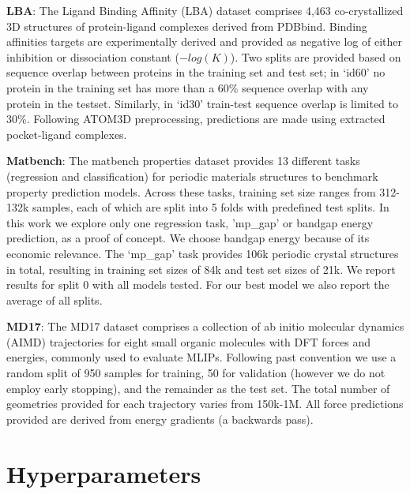 \textbf{LBA}: The Ligand Binding Affinity (LBA) dataset comprises 4,463  co-crystallized 3D structures of  protein-ligand complexes derived from PDBbind. Binding affinities targets are experimentally derived and provided as negative log of either inhibition or dissociation constant ($-log(K)$). Two splits are provided based on sequence overlap between proteins in the training set and test set; in ‘id60’ no protein in the training set has more than a 60\% sequence overlap with any protein in the testset. Similarly, in ‘id30’ train-test sequence overlap is limited to 30\%. Following ATOM3D preprocessing\cite{LBA_dataset}, predictions are made using extracted pocket-ligand complexes.


\textbf{Matbench}: The matbench properties dataset \cite{matbench_2020} provides 13 different tasks (regression and classification) for periodic materials structures to benchmark property prediction models. Across these tasks, training set size ranges from 312-132k samples, each of which are split into 5 folds with predefined test splits. In this work we explore only one regression task, 'mp\_gap' or bandgap energy prediction, as a proof of concept. We choose bandgap energy because of its economic relevance. The ‘mp\_gap’ task provides 106k periodic crystal structures in total, resulting in training set sizes of 84k and test set sizes of 21k. We report results for split 0 with all models tested. For our best model we also report the average of all splits.

\textbf{MD17}: The MD17 \cite{md17_chmiela2017machine} dataset comprises a collection of ab initio molecular dynamics (AIMD) trajectories for eight small organic molecules with DFT forces and energies, commonly used to evaluate MLIPs. Following past convention we use a random split of 950 samples for training, 50 for validation (however we do not employ early stopping), and the remainder as the test set. The total number of geometries provided for each trajectory varies from 150k-1M. All force predictions provided are derived from energy gradients (a backwards pass).



\section{Hyperparameters}


